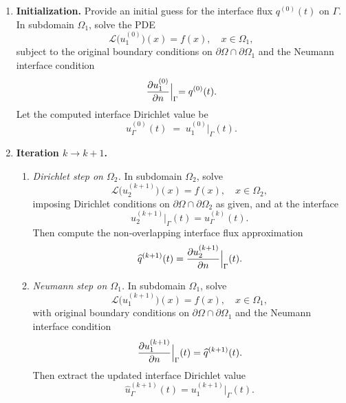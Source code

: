 \documentclass[12pt]{article}
\begin{document}
\begin{enumerate}
  \item \textbf{Initialization.}  Provide an initial guess for the interface flux \(q^{(0)}(t)\) on \(\Gamma\).  In subdomain \(\Omega_1\), solve the PDE
  \begin{equation}
    \mathcal{L}\bigl(u_1^{(0)}\bigr)(x) = f(x), \quad x\in \Omega_1,
  \end{equation}
  subject to the original boundary conditions on \(\partial\Omega\cap\partial\Omega_1\) and the Neumann interface condition
  \begin{equation}
    \frac{\partial u_1^{(0)}}{\partial n}\Bigl|_{\Gamma} 
    = q^{(0)}(t).
  \end{equation}
  Let the computed interface Dirichlet value be
  \begin{equation}
    u_\Gamma^{(0)}(t) \;=\; u_1^{(0)}\bigl|_{\Gamma}(t).
  \end{equation}

  \item \textbf{Iteration \(k\to k+1\).}
  \begin{enumerate}
    \item \emph{Dirichlet step on \(\Omega_2\).}  
    In subdomain \(\Omega_2\), solve
    \begin{equation}
      \mathcal{L}\bigl(u_2^{(k+1)}\bigr)(x) = f(x), \quad x\in \Omega_2,
    \end{equation}
    imposing Dirichlet conditions on \(\partial\Omega\cap\partial\Omega_2\) as given, and at the interface
    \begin{equation}
      u_2^{(k+1)}\bigl|_{\Gamma}(t) = u_\Gamma^{(k)}(t).
    \end{equation}
    Then compute the non‐overlapping interface flux approximation
    \begin{equation}
      \widehat{q}^{(k+1)}(t) 
      = \frac{\partial u_2^{(k+1)}}{\partial n}\Bigl|_{\Gamma}(t).
    \end{equation}

    \item \emph{Neumann step on \(\Omega_1\).}  
    In subdomain \(\Omega_1\), solve
    \begin{equation}
      \mathcal{L}\bigl(u_1^{(k+1)}\bigr)(x) = f(x), \quad x\in \Omega_1,
    \end{equation}
    with original boundary conditions on \(\partial\Omega\cap\partial\Omega_1\) and the Neumann interface condition
    \begin{equation}
      \frac{\partial u_1^{(k+1)}}{\partial n}\Bigl|_{\Gamma}(t) 
      = \widehat{q}^{(k+1)}(t).
    \end{equation}
    Then extract the updated interface Dirichlet value
    \begin{equation}
      \widehat{u}_\Gamma^{(k+1)}(t) 
      = u_1^{(k+1)}\bigl|_{\Gamma}(t).
    \end{equation}
  \end{enumerate}


\end{enumerate}
\end{document}
